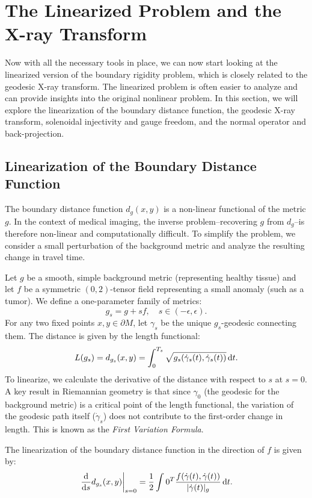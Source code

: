 \section{The Linearized Problem and the X-ray Transform}
\label{sec:the_linearized_problem_and_the_x_ray_transform}

Now with all the necessary tools in place, we can now start looking at the linearized version of the boundary rigidity problem, which is closely related to the geodesic X-ray transform. The linearized problem is often easier to analyze and can provide insights into the original nonlinear problem. In this section, we will explore the linearization of the boundary distance function, the geodesic X-ray transform, solenoidal injectivity and gauge freedom, and the normal operator and back-projection.

\subsection{Linearization of the Boundary Distance Function}
\label{sub_sec:linearization_of_the_boundary_distance_function}

The boundary distance function $d_g(x, y)$ is a non-linear functional of the metric $g$. In the context of medical imaging, the inverse problem--recovering $g$ from $d_g$--is therefore non-linear and computationally difficult. To simplify the problem, we consider a small perturbation of the background metric and analyze the resulting change in travel time.

Let $g$ be a smooth, simple background metric (representing healthy tissue) and let $f$ be a symmetric $(0,2)$-tensor field representing a small anomaly (such as a tumor). We define a one-parameter family of metrics:
\[%
  g_s = g + sf, \quad s \in (-\epsilon, \epsilon)
.\]%
For any two fixed points $x, y \in \partial M$, let $\gamma_s$ be the unique $g_s$-geodesic connecting them. The distance is given by the length functional:
\[%
  L(g_s) = d_{g_s}(x, y) = \int_0^{T_s} \sqrt{g_s(\dot{\gamma}_s(t), \dot{\gamma}_s(t))} \dt
.\]%
To linearize, we calculate the derivative of the distance with respect to $s$ at $s = 0$. A key result in Riemannian geometry is that since $\gamma_0$ (the geodesic for the background metric) is a critical point of the length functional, the variation of the geodesic path itself ($\dot{\gamma}_s$) does not contribute to the first-order change in length. This is known as the \emph{First Variation Formula}.

\begin{proposition}
  The linearization of the boundary distance function in the direction of $f$ is given by:
  \[%
    \left. \odv{}{s} d_{g_s}(x, y) \right\rvert_{s=0} = \frac{1}{2} \int{0}^{T} \frac{f(\dot{\gamma}(t), \dot{\gamma}(t))}{|\dot{\gamma}(t)|_g} \dt
  .\]%
\end{proposition}

